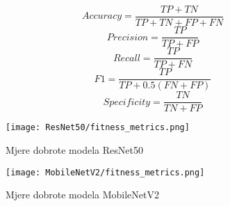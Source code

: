 \documentclass[conference, utf8]{IEEEtran}
\begin{document}
	\begin{equation}
		Accuracy = \frac{TP + TN}{TP + TN + FP + FN} \label{eq:1}
	\end{equation}
	\begin{equation}
		Precision = \frac{TP}{TP + FP} \label{eq:2}
	\end{equation}
	\begin{equation}
		Recall = \frac{TP}{TP + FN} \label{eq:3}
	\end{equation}
	\begin{equation}
		F1 = \frac{TP}{TP + 0.5(FN + FP)}\label{eq:4}
	\end{equation}
	\begin{equation}
		Specificity = \frac{TN}{TN + FP} \label{eq:5}
	\end{equation}
	
	
	\begin{figure}[H]
		\centering
		\texttt{[image: ResNet50/fitness\_metrics.png]}
		\caption{Mjere dobrote modela ResNet50}
		\label{fig:RN50_fit_met}
	\end{figure}
	
	
	
	\begin{figure}[H]
		\centering
		\texttt{[image: MobileNetV2/fitness\_metrics.png]}
		\caption{Mjere dobrote modela MobileNetV2}
		\label{fig:MN_fit_met}
	\end{figure}
	
\end{document}
